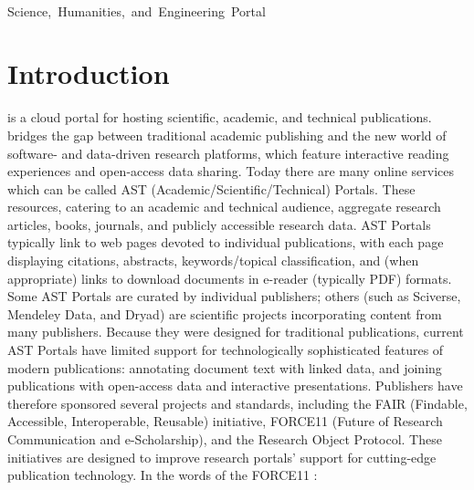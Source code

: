 \documentclass[10pt,letterpaper]{article}
\begin{document}
\vspace*{-6em}

\begin{center}
{}\\\vspace{2pt}
\mbox{Science, Humanities, and Engineering Portal}\\\vspace{3pt}
\end{center}

\vspace*{-2em}


\section{Introduction}
{\lfMOSAIC} is a cloud portal for hosting scientific, academic, and 
technical publications.  {\MOSAIC} bridges the gap between 
traditional academic publishing and the new 
world of software- and data-driven research platforms, 
which feature interactive reading experiences 
and open-access data sharing.
\p{}
Today there are many online services which 
can be called AST (Academic/Scientific/Technical) Portals.
These resources, catering 
to an academic and technical audience, aggregate 
research articles, books, journals, and publicly accessible 
research data.  
AST Portals typically link to web pages devoted to individual 
publications, with each page displaying citations, 
abstracts, keywords/topical classification, and 
(when appropriate) links to download documents  
in e-reader (typically PDF) formats.  
Some AST Portals are curated by 
individual publishers; others (such as Sciverse, Mendeley Data, 
and Dryad) are scientific projects  
incorporating content from many publishers.
\p{}
Because they were designed for traditional publications, 
current AST Portals have limited 
support for technologically sophisticated 
features of modern publications: annotating 
document text with linked data, and joining 
publications with open-access data and interactive 
presentations.  Publishers have therefore 
sponsored several projects and standards, including 
the FAIR (Findable, Accessible, Interoperable, 
Reusable) initiative, 
FORCE11 (Future of Research Communication and e-Scholarship), 
and the Research Object 
Protocol.  These initiatives are designed to 
improve research portals' support for cutting-edge 
publication technology.  In the 
words of the FORCE11 :
\qvspace{}
\end{document}

